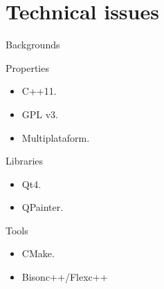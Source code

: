 \documentclass[12pt,xcolor=svgnames]{beamer}
\begin{document}
\section{Technical issues}

\begin{frame}{Backgrounds}

  \begin{block}{Properties}
    \begin{itemize}
    \item C++11.
    \item GPL v3.
    \item Multiplataform.
    \end{itemize}
  \end{block}

  \begin{block}{Libraries}
    \begin{itemize}
    \item Qt4.
    \item QPainter.
    \end{itemize}
  \end{block}

  \begin{block}{Tools}
    \begin{itemize}
    \item CMake.
    \item Bisonc++/Flexc++
    \end{itemize}
  \end{block}

\end{frame}
\end{document}
